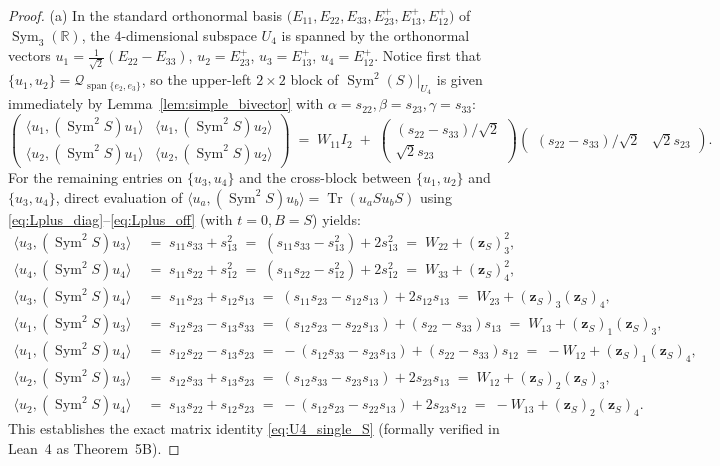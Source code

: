 \documentclass[11pt,a4paper]{article}
\theoremstyle{plain}
\theoremstyle{definition}
\theoremstyle{remark}
\DeclareMathOperator{\Tr}{Tr}
\DeclareMathOperator{\Sym}{Sym}
\begin{document}
\begin{proof}
(a) In the standard orthonormal basis $\big(E_{11}, E_{22}, E_{33}, E_{23}^+, E_{13}^+, E_{12}^+\big)$ of $\Sym_3(\mathbb{R})$, the $4$-dimensional subspace $U_4$ is spanned by the orthonormal vectors $u_1 = \frac{1}{\sqrt{2}}(E_{22} - E_{33})$, $u_2 = E_{23}^+$, $u_3 = E_{13}^+$, $u_4 = E_{12}^+$. Notice first that $\{u_1, u_2\} = \mathcal{Q}_{\operatorname{span}\{e_2,e_3\}}$, so the upper-left $2 \times 2$ block of $\Sym^2(S)|_{U_4}$ is given immediately by Lemma~\ref{lem:simple_bivector} with $\alpha = s_{22}, \beta = s_{23}, \gamma = s_{33}$:
\[
  \begin{pmatrix} \langle u_1, (\Sym^2 S)u_1 \rangle & \langle u_1, (\Sym^2 S)u_2 \rangle \\ \langle u_2, (\Sym^2 S)u_1 \rangle & \langle u_2, (\Sym^2 S)u_2 \rangle \end{pmatrix}
  \;=\; W_{11} I_2 \;+\; \begin{pmatrix} (s_{22}-s_{33})/\sqrt{2} \\ \sqrt{2}s_{23} \end{pmatrix}\begin{pmatrix} (s_{22}-s_{33})/\sqrt{2} & \sqrt{2}s_{23} \end{pmatrix}.
\]
For the remaining entries on $\{u_3, u_4\}$ and the cross-block between $\{u_1, u_2\}$ and $\{u_3, u_4\}$, direct evaluation of $\langle u_a, (\Sym^2 S) u_b \rangle = \Tr(u_a S u_b S)$ using \eqref{eq:Lplus_diag}--\eqref{eq:Lplus_off} (with $t = 0, B = S$) yields:
\begin{align*}
  \langle u_3, (\Sym^2 S) u_3 \rangle &\;=\; s_{11}s_{33} + s_{13}^2 \;=\; (s_{11}s_{33} - s_{13}^2) + 2 s_{13}^2 \;=\; W_{22} + (\mathbf{z}_S)_3^2, \\
  \langle u_4, (\Sym^2 S) u_4 \rangle &\;=\; s_{11}s_{22} + s_{12}^2 \;=\; (s_{11}s_{22} - s_{12}^2) + 2 s_{12}^2 \;=\; W_{33} + (\mathbf{z}_S)_4^2, \\
  \langle u_3, (\Sym^2 S) u_4 \rangle &\;=\; s_{11}s_{23} + s_{12}s_{13} \;=\; (s_{11}s_{23} - s_{12}s_{13}) + 2 s_{12}s_{13} \;=\; W_{23} + (\mathbf{z}_S)_3(\mathbf{z}_S)_4, \\
  \langle u_1, (\Sym^2 S) u_3 \rangle &\;=\; s_{12}s_{23} - s_{13}s_{33} \;=\; (s_{12}s_{23} - s_{22}s_{13}) + (s_{22} - s_{33})s_{13} \;=\; W_{13} + (\mathbf{z}_S)_1(\mathbf{z}_S)_3, \\
  \langle u_1, (\Sym^2 S) u_4 \rangle &\;=\; s_{12}s_{22} - s_{13}s_{23} \;=\; -(s_{12}s_{33} - s_{23}s_{13}) + (s_{22} - s_{33})s_{12} \;=\; -W_{12} + (\mathbf{z}_S)_1(\mathbf{z}_S)_4, \\
  \langle u_2, (\Sym^2 S) u_3 \rangle &\;=\; s_{12}s_{33} + s_{13}s_{23} \;=\; (s_{12}s_{33} - s_{23}s_{13}) + 2 s_{23}s_{13} \;=\; W_{12} + (\mathbf{z}_S)_2(\mathbf{z}_S)_3, \\
  \langle u_2, (\Sym^2 S) u_4 \rangle &\;=\; s_{13}s_{22} + s_{12}s_{23} \;=\; -(s_{12}s_{23} - s_{22}s_{13}) + 2 s_{23}s_{12} \;=\; -W_{13} + (\mathbf{z}_S)_2(\mathbf{z}_S)_4.
\end{align*}
This establishes the exact matrix identity \eqref{eq:U4_single_S} (formally verified in Lean~4 as Theorem~5B).


\end{proof}
\end{document}
